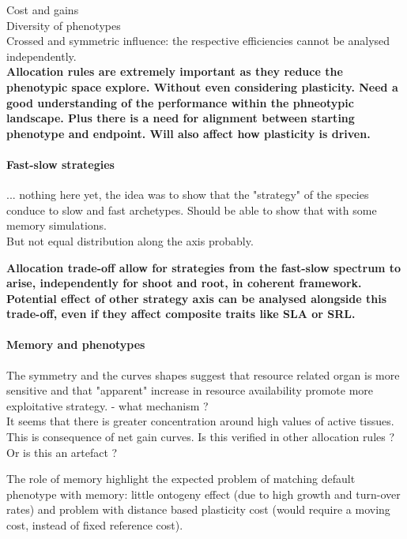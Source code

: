 Cost and gains\\

Diversity of phenotypes\\

Crossed and symmetric influence: the respective efficiencies cannot be analysed independently.\\



\textbf{Allocation rules are extremely important as they reduce the phenotypic space explore. Without even considering plasticity. Need a good understanding of the performance within the phneotypic landscape. Plus there is a need for alignment between starting phenotype and endpoint. Will also affect how plasticity is driven.}

\paragraph{Fast-slow strategies}

... nothing here yet, the idea was to show that the "strategy" of the species conduce to slow and fast archetypes. Should be able to show that with some memory simulations.\\

But not equal distribution along the axis probably.


\textbf{Allocation trade-off allow for strategies from the fast-slow spectrum to arise, independently for shoot and root, in coherent framework. Potential effect of other strategy axis can be analysed alongside this trade-off, even if they affect composite traits like SLA or SRL.}

\paragraph{Memory and phenotypes}

 The symmetry and the curves shapes suggest that resource related organ is more sensitive and that "apparent" increase in resource availability promote more exploitative strategy. - what mechanism ?\\
 
It seems that there is greater concentration around high values of active tissues. This is consequence of net gain curves. Is this verified in other allocation rules ? Or is this an artefact ?
 
The role of memory highlight the expected problem of matching default phenotype with memory: little ontogeny effect (due to high growth and turn-over rates) and problem with distance based plasticity cost (would require a moving cost, instead of fixed reference cost).

